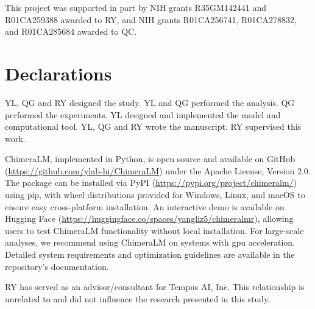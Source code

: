\documentclass[pdflatex,sn-nature]{sn-jnl}%
\theoremstyle{thmstyleone}%
\theoremstyle{thmstyletwo}%
\theoremstyle{thmstylethree}%
\begin{document}

This project was supported in part by NIH grants R35GM142441 and R01CA259388 awarded to RY, and NIH grants R01CA256741, R01CA278832, and R01CA285684 awarded to QC.

\section*{Declarations}


YL, QG and RY designed the study.
YL and QG performed the analysis.
QG performed the experiments.
YL designed and implemented the model and computational tool.
YL, QG and RY wrote the manuscript.
RY supervised this work.



ChimeraLM, implemented in Python, is open source and available on GitHub (\url{https://github.com/ylab-hi/ChimeraLM}) under the Apache License, Version 2.0.
The package can be installed via PyPI (\url{https://pypi.org/project/chimeralm/}) using pip, with wheel distributions provided for Windows, Linux, and macOS to ensure easy cross-platform installation.
An interactive demo is available on Hugging Face (\url{https://huggingface.co/spaces/yangliz5/chimeralmr}), allowing users to test ChimeraLM functionality without local installation.
For large-scale analyses, we recommend using ChimeraLM on systems with \gls{gpu} acceleration. Detailed system requirements and optimization guidelines are available in the repository's documentation.


RY has served as an advisor/consultant for Tempus AI, Inc. This relationship is unrelated to and did not influence the research presented in this study.


%
\end{document}
